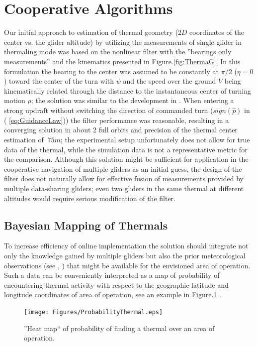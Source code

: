 \documentclass{ifacconf}
\begin{document}
\section{Cooperative Algorithms}
\label{sec:CoopAlgs}
Our initial approach to estimation of thermal geometry  ($2D$ coordinates of the center vs. the glider altitude) by utilizing the measurements of single glider in thermaling mode was based on the nonlinear filter with the ''bearings only measurements'' and the kinematics presented in Figure.\ref{fig:ThermaG}. In this formulation the bearing to the center was assumed to be constantly at $\pi/2$ ($\eta=0$)  toward the center of the turn with $\dot{\psi}$ and the speed over the ground $V$ being kinematically related through the distance to the instantaneous center of turning motion $\rho$; the solution was similar to the development in  \cite{Dobrokhodov:2008}. When entering a strong updraft without switching the direction of commanded turn ($sign(\hat{p})$ in ( \ref{eq:GuidanceLaw})) the filter performance was reasonable, resulting in a converging solution in about 2 full orbits and precision of the thermal center estimation of $~75m$; the experimental setup unfortunately does not allow for true data of the thermal, while the simulation data is not a representative metric for the comparison. Although this solution might be sufficient for application in the cooperative navigation of multiple gliders as an initial guess, the design of the filter does not naturally allow for effective fusion of measurements provided by multiple data-sharing gliders; even two gliders in the same thermal at different altitudes would require serious modification of the filter.

\subsection{Bayesian Mapping of Thermals}
\label{subsec:BayesianMapping}
To increase efficiency of online implementation the solution should integrate not only the knowledge gained by multiple gliders but also the prior meteorological observations (see \cite{Pennycuick:1998}, \cite{Hindman:2007}) that might be available for the envisioned area of operation. Such a data can be conveniently interpreted as a map of probability of encountering thermal activity with respect to the geographic latitude and longitude coordinates of area of operation, see an example in Figure.\ref{fig:HeatMap}   .
\begin{figure}[thpb]
  \centering
  \texttt{[image: Figures/ProbabilityThermal.eps]}
  \caption{''Heat map`` of probability of finding a thermal over an area of operation.}
  \label{fig:HeatMap}
\end{figure}
\end{document}
